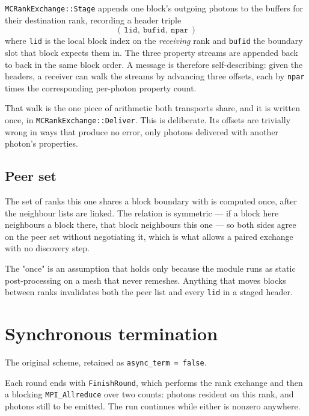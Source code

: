 \documentclass[11pt]{article}
\begin{document}
\texttt{MCRankExchange::Stage} appends one block's outgoing photons to the buffers for
their destination rank, recording a header triple
\begin{equation}
  (\,\texttt{lid},\ \texttt{bufid},\ \texttt{npar}\,)
  \label{eq:triple}
\end{equation}
where \texttt{lid} is the local block index on the \emph{receiving} rank and \texttt{bufid}
the boundary slot that block expects them in. The three property streams are appended back
to back in the same block order. A message is therefore self-describing: given the headers,
a receiver can walk the streams by advancing three offsets, each by
\texttt{npar} times the corresponding per-photon property count.

That walk is the one piece of arithmetic both transports share, and it is written once, in
\texttt{MCRankExchange::Deliver}. This is deliberate. Its offsets are trivially wrong in
ways that produce no error, only photons delivered with another photon's properties.

\subsection{Peer set}

The set of ranks this one shares a block boundary with is computed once, after the
neighbour lists are linked. The relation is symmetric --- if a block here neighbours a
block there, that block neighbours this one --- so both sides agree on the peer set without
negotiating it, which is what allows a paired exchange with no discovery step.

The "once" is an assumption that holds only because the module runs as static
post-processing on a mesh that never remeshes. Anything that moves blocks between ranks
invalidates both the peer list and every \texttt{lid} in a staged header.

\section{Synchronous termination}
\label{sec:sync}

The original scheme, retained as \texttt{async\_term = false}.

Each round ends with \texttt{FinishRound}, which performs the rank exchange and then a
blocking \texttt{MPI\_Allreduce} over two counts: photons resident on this rank, and
photons still to be emitted. The run continues while either is nonzero anywhere.
\end{document}
